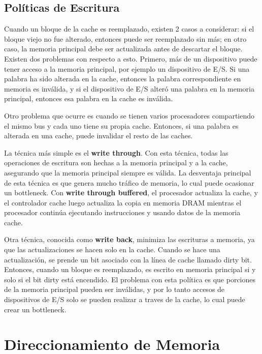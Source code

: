 \subsection{Pol\'iticas de Escritura}

Cuando un bloque de la cache es reemplazado, existen 2 casos a considerar: si el bloque viejo no fue alterado, entonces puede ser reemplazado
sin m\'as; en otro caso, la memoria principal debe ser actualizada antes de descartar el bloque. Existen dos problemas con respecto a esto. 
Primero, m\'as de un dispositivo puede tener acceso a la memoria principal, por ejemplo un dispositivo de E/S. Si una palabra ha sido alterada
en la cache, entonces la palabra correspondiente en memoria es inv\'alida, y si el dispositivo de E/S alter\'o una palabra en la memoria
principal, entonces esa palabra en la cache es inv\'alida.

Otro problema que ocurre es cuando se tienen varios procesadores compartiendo el mismo bus y cada uno tiene su propia cache. Entonces, si una
palabra es alterada en una cache, puede invalidar el resto de las caches.

La t\'ecnica m\'as simple es el \textbf{write through}. Con esta t\'ecnica, todas las operaciones de escritura son hechas a la memoria principal
y a la cache, asegurando que la memoria principal siempre es v\'alida. La desventaja principal de esta t\'ecnica es que genera mucho
tr\'afico de memoria, lo cual puede ocasionar un bottleneck. Con \textbf{write through buffered}, el procesador actualiza la cache, y el controlador
cache luego actualiza la copia en memoria DRAM mientras el procesador contin\'ua ejecutando instrucciones y usando datos de la memoria cache.

Otra t\'ecnica, conocida como \textbf{write back}, minimiza las escrituras a memoria, ya que las actualizaciones se hacen solo en la cache. Cuando
se hace una actualizaci\'on, se prende un bit asociado con la l\'inea de cache llamado dirty bit. Entonces, cuando un bloque es reemplazado, 
es escrito en memoria principal si y solo si el bit dirty est\'a encendido. El problema con esta pol\'itica es que porciones de la memoria principal
pueden ser inv\'alidas, y por lo tanto accesos de dispositivos de E/S solo se pueden realizar a traves de la cache, lo cual puede crear un bottleneck.

\newpage
\section{Direccionamiento de Memoria}

